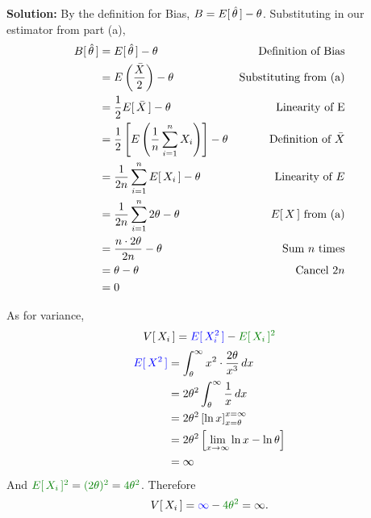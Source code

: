 \textbf{Solution: } By the definition for Bias, $B = E[ \,{\hat{\theta}}\, ] - \theta$. Substituting in our estimator from part (a),
\begin{align*}
    B[ \,{\hat{\theta}}\, ] &= E[ \,{\hat{\theta}}\, ] - \theta & \text{ Definition of Bias}\\
    &= E \left( {\frac{\bar{X}}{2}} \right) - \theta & \text{Substituting from (a)}\\
    &= \frac{1}{{2}} E[ \,{\bar{X}}\, ] - \theta & \text{Linearity of E}\\
    &= \frac{1}{{2}} \left[ {E \left( {\frac{1}{{n}} \sum_{i = 1}^n X_i } \right)} \right] - \theta & \text{Definition of } \bar{X} \\
    &= \frac{1}{{2n}} \sum_{i = 1}^n E[ \,{X_i}\, ] - \theta & \text{Linearity of } E\\
    &= \frac{1}{{2n}} \sum_{i = 1}^n 2\theta - \theta & E[ \,{X}\, ] \text{ from (a)}\\
    &= \frac{n\cdot 2\theta}{2n} - \theta & \text{Sum } n \text{ times}\\
    &= \theta - \theta & \text{Cancel } 2n\\
    &= 0
\end{align*}
\begin{center} 
\end{center}
As for variance, 
$$\Vb{X_i} = \blu{\Eb{X_i^2}} - \grn{\Eb{X_i}^2}$$
\begin{align*}
    \color{blue}{E[ \,{X^2}\, ]}\color{black} &= \int_{\theta}^{\infty} x^2 \cdot \frac{2\theta}{x^3}\,dx \\
    &= 2\theta^2 \int_{\theta}^{\infty} \frac{1}{{x}}\,dx\\
    &= 2\theta^2 \left[ {\ln x} \right]_{x = \theta}^{x = \infty}\\
    &= 2\theta^2 \left[ {\lim_{x\to\infty} \ln x - \ln \theta} \right]\\
    &= \infty
\end{align*}
And $\grn{\Eb{X_i}^2} = \grn{(2\theta)^2} = \grn{4\theta^2}$. Therefore 
$$\Vb{X_i} = \blu{\infty} - \grn{4\theta^2} = \infty.$$
\begin{center} 
\end{center}